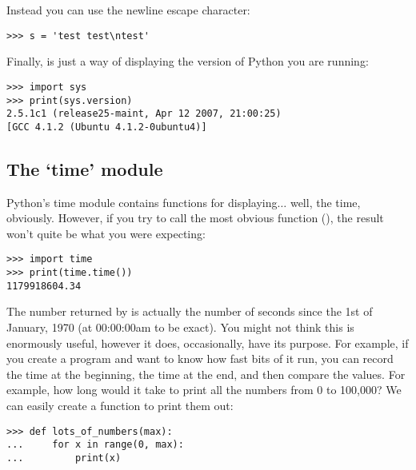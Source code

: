 Instead you can use the newline escape character:
\begin{listing}
\begin{verbatim}
>>> s = 'test test\ntest'
\end{verbatim}
\end{listing}

\noindent
Finally,  is just a way of displaying the version of Python you are running:

\begin{listingignore}
\begin{verbatim}
>>> import sys
>>> print(sys.version)
2.5.1c1 (release25-maint, Apr 12 2007, 21:00:25) 
[GCC 4.1.2 (Ubuntu 4.1.2-0ubuntu4)]
\end{verbatim}
\end{listingignore}

\subsection*{The `time' module}

Python's time module contains functions for displaying$\ldots$ well, the time, obviously. However, if you try to call the most obvious function (), the result won't quite be what you were expecting:

\begin{listingignore}
\begin{verbatim}
>>> import time
>>> print(time.time())
1179918604.34
\end{verbatim}
\end{listingignore}

The number returned by  is actually the number of seconds since the 1st of January, 1970 (at 00:00:00am to be exact). You might not think this is enormously useful, however it does, occasionally, have its purpose. For example, if you create a program and want to know how fast bits of it run, you can record the time at the beginning, the time at the end, and then compare the values. For example, how long would it take to print all the numbers from 0 to 100,000?  We can easily create a function to print them out:

\begin{listing}
\begin{verbatim}
>>> def lots_of_numbers(max):
...     for x in range(0, max):
...         print(x)
\end{verbatim}
\end{listing}


